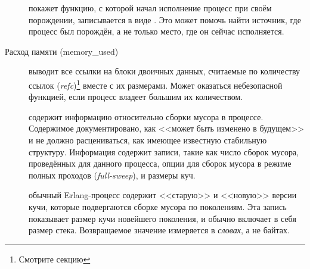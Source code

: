 \begin{description*}
\begin{description}
	\item[] покажет функцию, с которой начал исполнение процесс при своём порождении, записывается в виде . Это может помочь найти источник, где процесс был порождён, а не только место, где он сейчас исполняется.
\end{description}

\item[Расход памяти (memory\_used)] \hfill
	\begin{description}
	\item[] выводит все ссылки на блоки двоичных данных, считаемые по количеству ссылок (\emph{refc})\footnote{Смотрите секцию } вместе с их размерами. Может оказаться небезопасной функцией, если процесс владеет большим их количеством.
		
	\item[] содержит информацию относительно сборки мусора в процессе. Содержимое документировано, как <<может быть изменено в будущем>> и не должно расцениваться, как имеющее известную стабильную структуру. Информация содержит записи, такие как число сборок мусора, проведённых для данного процесса, опции для сборок мусора в режиме полных проходов (\emph{full-sweep}), и размеры куч.

	\item[] обычный Erlang-процесс содержит <<старую>> и <<новую>> версии кучи, которые подвергаются сборке мусора по поколениям. Эта запись показывает размер кучи новейшего поколения, и обычно включает в себя размер стека. Возвращаемое значение измеряется в \emph{словах}, а не байтах.
	

\end{description}
\end{description*}

